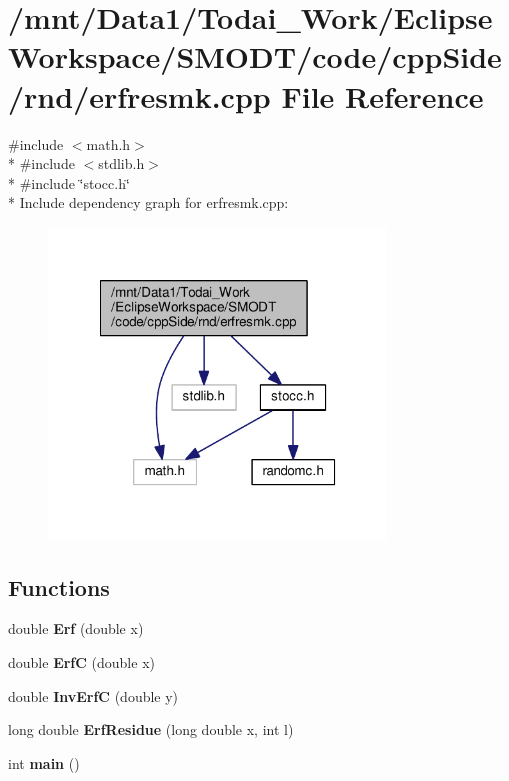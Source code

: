 \section{/mnt/\-Data1/\-Todai\-\_\-\-Work/\-Eclipse\-Workspace/\-S\-M\-O\-D\-T/code/cpp\-Side/rnd/erfresmk.cpp File Reference}
\label{rnd_2erfresmk_8cpp}
{\ttfamily \#include $<$math.\-h$>$}\\*
{\ttfamily \#include $<$stdlib.\-h$>$}\\*
{\ttfamily \#include \char`\"{}stocc.\-h\char`\"{}}\\*
Include dependency graph for erfresmk.\-cpp\-:
\nopagebreak
\begin{figure}[H]
\begin{center}
\leavevmode
\includegraphics[width=254pt]{rnd_2erfresmk_8cpp__incl}
\end{center}
\end{figure}
\subsection*{Functions}
\begin{DoxyCompactItemize}
\item 
double {\bf Erf} (double x)
\item 
double {\bf Erf\-C} (double x)
\item 
double {\bf Inv\-Erf\-C} (double y)
\item 
long double {\bf Erf\-Residue} (long double x, int l)
\item 
int {\bf main} ()
\end{DoxyCompactItemize}
